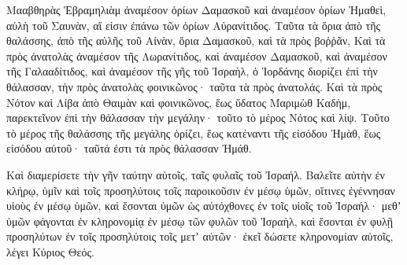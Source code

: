 {Μααβθηρὰς Ἑβραμηλιὰμ ἀναμέσον ὁρίων Δαμασκοῦ καὶ ἀναμέσον ὁρίων Ἠμαθεὶ, αὐλὴ τοῦ Σαυνὰν, αἵ εἰσιν ἐπάνω τῶν ὁρίων Αὐρανίτιδος.
Ταῦτα τὰ ὅρια ἀπὸ τῆς θαλάσσης, ἀπὸ τῆς αὐλῆς τοῦ Αἰνὰν, ὅρια Δαμασκοῦ, καὶ τὰ πρὸς βοῤῥᾶν,
Καὶ τὰ πρὸς ἀνατολὰς ἀναμέσον τῆς Λωρανίτιδος, καὶ ἀναμέσον Δαμασκοῦ, καὶ ἀναμέσον τῆς Γαλααδίτιδος, καὶ ἀναμέσον τῆς γῆς τοῦ Ἰσραὴλ, ὁ Ἰορδάνης διορίζει ἐπὶ τὴν θάλασσαν, τὴν πρὸς ἀνατολὰς φοινικῶνος· ταῦτα τὰ πρὸς ἀνατολάς.
Καὶ τὰ πρὸς Νότον καὶ Λίβα ἀπὸ Θαιμὰν καὶ φοινικῶνος, ἕως ὕδατος Μαριμὼθ Καδὴμ, παρεκτεῖνον ἐπὶ τὴν θάλασσαν τὴν μεγάλην·
τοῦτο τὸ μέρος Νότος καὶ λίψ. Τοῦτο τὸ μέρος τῆς θαλάσσης τῆς μεγάλης ὁρίζει, ἕως κατέναντι τῆς εἰσόδου Ἠμὰθ, ἕως εἰσόδου αὐτοῦ· ταῦτά ἐστι τὰ πρὸς θάλασσαν Ἠμάθ.
\par }{\PP {}Καὶ διαμερίσετε τὴν γῆν ταύτην αὐτοῖς, ταῖς φυλαῖς τοῦ Ἰσραήλ.
Βαλεῖτε αὐτὴν ἐν κλήρῳ, ὑμῖν καὶ τοῖς προσηλύτοις τοῖς παροικοῦσιν ἐν μέσῳ ὑμῶν, οἵτινες ἐγέννησαν υἱοὺς ἐν μέσῳ ὑμῶν, καὶ ἔσονται ὑμῶν ὡς αὐτόχθονες ἐν τοῖς υἱοῖς τοῦ Ἰσραήλ· μεθʼ ὑμῶν φάγονται ἐν κληρονομίᾳ ἐν μέσῳ τῶν φυλῶν τοῦ Ἰσραὴλ,
καὶ ἔσονται ἐν φυλῇ προσηλύτων ἐν τοῖς προσηλύτοις τοῖς μετʼ αὐτῶν· ἐκεῖ δώσετε κληρονομίαν αὐτοῖς, λέγει Κύριος Θεός.

}
